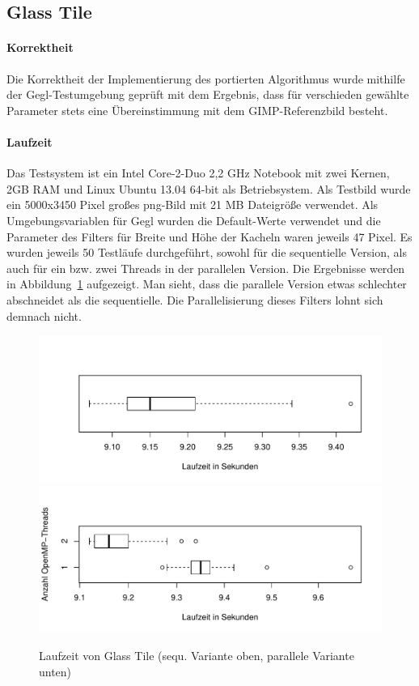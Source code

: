 \subsection{Glass Tile}
\paragraph{Korrektheit}
Die Korrektheit der Implementierung des portierten Algorithmus wurde mithilfe der Gegl-Testumgebung geprüft mit dem Ergebnis, dass für verschieden gewählte Parameter stets eine Übereinstimmung mit dem GIMP-Referenzbild besteht.

\paragraph{Laufzeit}
Das Testsystem ist ein Intel Core-2-Duo 2,2 GHz Notebook mit zwei Kernen, 2GB RAM und Linux Ubuntu 13.04 64-bit als Betriebsystem. Als Testbild wurde ein 5000x3450 Pixel großes png-Bild mit 21 MB Dateigröße verwendet. Als Umgebungsvariablen für Gegl wurden die Default-Werte verwendet und die Parameter des Filters für Breite und Höhe der Kacheln waren jeweils 47 Pixel. Es wurden jeweils 50 Testläufe durchgeführt, sowohl für die sequentielle Version, als auch für ein bzw. zwei Threads in der parallelen Version. Die Ergebnisse werden in Abbildung~\ref{fig:gtile-runs} aufgezeigt. Man sieht, dass die parallele Version etwas schlechter abschneidet als die sequentielle. Die Parallelisierung dieses Filters lohnt sich demnach nicht.

\begin{figure}[h]
\begin{center}
\includegraphics[width=1.0\textwidth]{graphs/glass-tile_seq.pdf}\newline
\includegraphics[width=1.0\textwidth]{graphs/glass-tile_2threads.pdf}
\end{center}
\caption{Laufzeit von Glass Tile (sequ. Variante oben, parallele Variante unten)}\label{fig:gtile-runs}
\end{figure}

